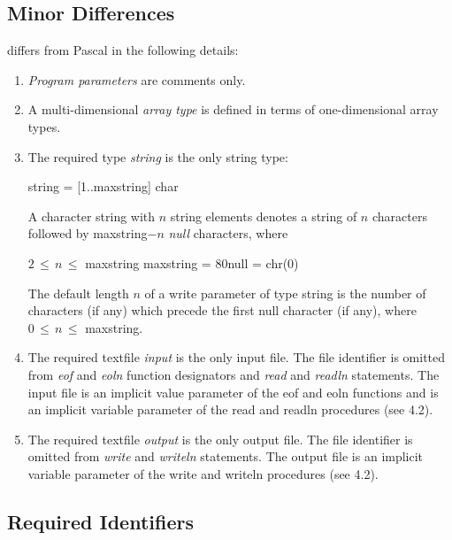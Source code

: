 \subsection{Minor Differences}

{\Superpascal} differs from Pascal in the following details:

\begin{enumerate}
  \item
  {\it Program parameters} are comments only.
  \item
  A multi-dimensional {\it array type} is defined in terms
  of one-dimensional array types.
  \item
  The required type {\it string} is the only string type:

  \begin{center}
    string = {\Array} [1..maxstring] {\Of} char
  \end{center}

  \noindent
  A character string with $n$ string elements denotes a
  string of $n$ characters followed by maxstring$-n$ {\it
  null} characters, where

  \begin{center}
     $2\,{\leq}\,n\,{\leq}$ maxstring{\blank}
     maxstring = 80{\blank}null = chr(0)\\
  \end{center}

  \noindent
  The default length $n$ of a write parameter of type string
  is the number of characters (if any) which precede the
  first null character (if any), where
  $0\,{\leq}\,n\,{\leq}$ maxstring.
  \item
  The required textfile {\it input} is the only input file.
  The file identifier is omitted from {\it eof} and {\it
  eoln} function designators and {\it read} and {\it readln}
  statements. The input file is an implicit value parameter
  of the eof and eoln functions and is an implicit variable
  parameter of the read and readln procedures (see 4.2).
  \item
  The required textfile {\it output} is the only output
  file. The file identifier is omitted from {\it write} and
  {\it writeln} statements. The output file is an implicit
  variable parameter of the write and writeln procedures
  (see 4.2).
\end{enumerate}


\subsection{Required Identifiers}


